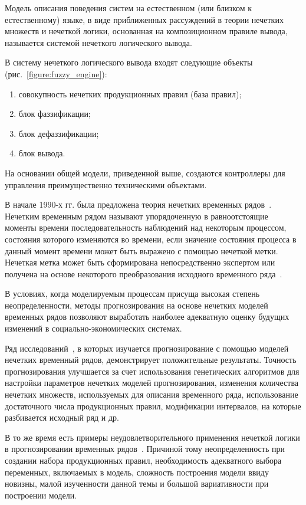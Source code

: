 Модель описания поведения систем на естественном (или близком к естественному) языке,
в виде приближенных рассуждений в теории нечетких множеств и нечеткой логики,
основанная на композиционном правиле вывода, называется системой нечеткого логического вывода.

В систему нечеткого логического вывода входят следующие объекты (рис.~\ref{figure:fuzzy_engine}):
\begin{enumerate} 
    \item совокупность нечетких продукционных правил (база правил);
    \item блок фаззификации;
    \item блок дефаззификации;
    \item блок вывода.
\end{enumerate}

На основании общей модели, приведенной выше, создаются контроллеры для управления преимущественно техническими объектами.

В начале 1990-х гг. была предложена теория нечетких временных рядов~\cite{Song1993}. 
Нечетким временным рядом называют упорядоченную в равноотстоящие моменты времени последовательность наблюдений над некоторым процессом,
состояния которого изменяются во времени, если значение состояния процесса в данный момент времени может быть выражено с помощью нечеткой метки. 
Нечеткая метка может быть сформирована непосредственно экспертом или получена на основе некоторого преобразования исходного временного ряда~\cite{Yarushkina2010}. 

В условиях, когда моделируемым процессам присуща высокая степень неопределенности, 
методы прогнозирования на основе нечетких моделей временных рядов позволяют выработать наиболее адекватную оценку будущих изменений в социально-экономических системах.

Ряд исследований~\cite{Chen1996,S.Melike2008,Saxena2012}, в которых изучается прогнозирование с помощью моделей нечетких временный рядов, 
демонстрирует положительные результаты. 
Точность прогнозирования улучшается за счет использования генетических алгоритмов для настройки параметров нечетких моделей прогнозирования, 
изменения количества нечетких множеств, используемых для описания временного ряда, использование достаточного числа продукционных правил, 
модификации интервалов, на которые разбивается исходный ряд и др.

В то же время есть примеры неудовлетворительного применения нечеткой логики в прогнозировании временных рядов~\cite{Hoekstr2010}. 
Причиной тому неопределенность при создании набора продукционных правил, необходимость адекватного выбора переменных, 
включаемых в модель, сложность построения модели ввиду новизны, малой изученности данной темы и большой вариативности при построении модели.

